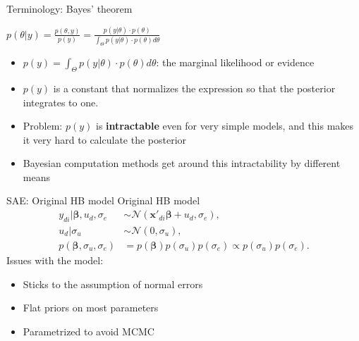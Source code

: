 \begin{frame}{Terminology: Bayes' theorem}
    \begin{center}
        $p(\theta|y) = \displaystyle \frac{p(\theta, y)}{p(y)} = \displaystyle \frac{p(y|\theta) \cdot p(\theta)}{\int_\Theta p(y|\theta) \cdot p(\theta) d\theta}$\\
    \end{center}

    \begin{itemize}

        \item
        $p(y) = \int_\Theta p(y|\theta) \cdot p(\theta) d\theta$: the marginal likelihood or evidence

        \item
        $p(y)$ is a constant that normalizes the expression so that the posterior integrates to one.

        \item
        Problem: $p(y)$ is \textbf{intractable} even for very simple models, and this makes it very hard to calculate the posterior

        \item
        Bayesian computation methods get around this intractability by different means


    \end{itemize}

\end{frame}

\begin{frame}{SAE: Original HB model}
    \vspace{-1cm}
    Original HB model \cite{molina_small_2014}
    \begin{equation*}
        \label{eq:hb_rao}
        \begin{split}
            y_{di} |\boldsymbol \beta, u_d, \sigma_e & \sim \mathcal N(\boldsymbol{x'}_{di} \boldsymbol{\beta}+ u_d, \sigma_e), \\
            u_d | \sigma_u & \sim \mathcal N(0, \sigma_u), \\
            p(\boldsymbol \beta, \sigma_u, \sigma_e) & = p(\boldsymbol \beta) p(\sigma_u)p(\sigma_e) \propto p(\sigma_u)p(\sigma_e).
        \end{split}
    \end{equation*}
    Issues with the model:
    \begin{itemize}
        \item Sticks to the assumption of normal errors
        \item Flat priors on most parameters
        \item Parametrized to avoid MCMC
    \end{itemize}
\end{frame}

